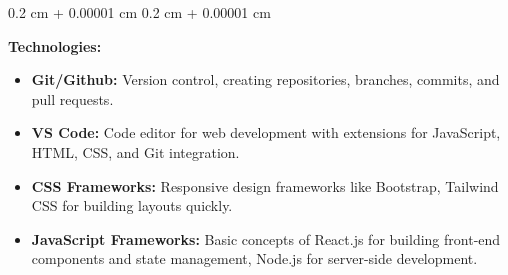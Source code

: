 \documentclass[10pt, letterpaper]{article}
\newenvironment{onecolentry}{
    \begin{adjustwidth}{
        0.2 cm + 0.00001 cm
    }{
        0.2 cm + 0.00001 cm
    }
}{
    \end{adjustwidth}
} %
\begin{document}
        \vspace{0.2 cm}

        \begin{onecolentry}
    \textbf{Technologies:} 
    \begin{itemize}
        \item \textbf{Git/Github:} Version control, creating repositories, branches, commits, and pull requests.
        \item \textbf{VS Code:} Code editor for web development with extensions for JavaScript, HTML, CSS, and Git integration.
        \item \textbf{CSS Frameworks:} Responsive design frameworks like Bootstrap, Tailwind CSS for building layouts quickly.
        \item \textbf{JavaScript Frameworks:} Basic concepts of React.js for building front-end components and state management, Node.js for server-side development.
    \end{itemize}
\end{onecolentry}

  
\end{document}
